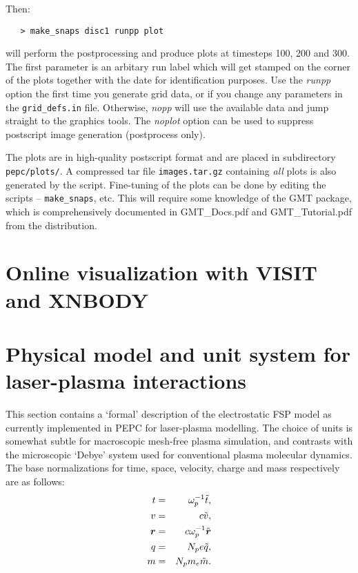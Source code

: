 \documentclass[11pt,psfig]{article}
\def\bea{\begin{eqnarray}}
\def\eea{\end{eqnarray}}
\newcommand{\meno}{{\medskip\noindent}}
\newcommand{\bm}[1]{\mbox{\boldmath$#1$}}
\begin{document}
\noindent
Then:

\begin{verbatim}
   > make_snaps disc1 runpp plot
\end{verbatim}

\noindent
will perform the postprocessing and produce plots at timesteps 100, 200
and 300.  The first parameter is an arbitary run label which will get stamped
on the corner of the plots together with the date for identification purposes.
Use the \textit{runpp} option the first time you generate grid data, or if you change
any parameters in the \texttt{grid_defs.in} file.  Otherwise, \textit{nopp} will use the available
data and jump straight to the graphics tools.  The \textit{noplot} option can be used to
suppress postscript image generation (postprocess only).

\meno
The plots are in high-quality postscript format and are placed in subdirectory 
\texttt{pepc/plots/}.
A compressed tar file \texttt{images.tar.gz} containing \textit{all} plots is also generated by the script.
Fine-tuning of the plots can be done by editing the scripts --
\texttt{make_snaps}, etc.  This will require some knowledge of the GMT package, which is
comprehensively documented in GMT_Docs.pdf and GMT_Tutorial.pdf from the distribution.

\section{Online visualization with VISIT and XNBODY}

\section{Physical model and unit system for laser-plasma interactions}

This section contains a `formal' description of the electrostatic FSP model as
currently implemented in PEPC for laser-plasma modelling.  The choice of units is somewhat subtle for
macroscopic mesh-free plasma simulation, and contrasts with the microscopic `Debye' system used for conventional plasma molecular dynamics.  The base normalizations for
time, space, velocity, charge and mass respectively are as follows:
\bea 
t &=& \omega_p^{-1}\tilde{t}, \nonumber\\ 
v&=&c\tilde{v}, \nonumber \\
 \bm{r} &=& c \omega_p^{-1}\tilde{\bm{r}} \nonumber \\
q&=& N_p e \tilde{q}, \nonumber \\ 
m &=& N_p m_e \tilde{m}.
\label{norms}
\eea
\end{document}
